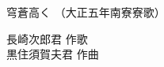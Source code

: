 \documentclass[10pt,b5j]{tarticle} %
\begin{document}
\begin{minipage}[c]{0.7\hsize} %
    \begin{center}
        {\LARGE
            穹蒼高く %
        }
        {\small 
            （大正五年南寮寮歌） %
        }
    \end{center}
\end{minipage}
\begin{minipage}[c]{0.3\hsize} %
    \begin{flushright} %
        長崎次郎君 作歌\\黒住須賀夫君 作曲 %
    \end{flushright}
\end{minipage}
\end{document}
